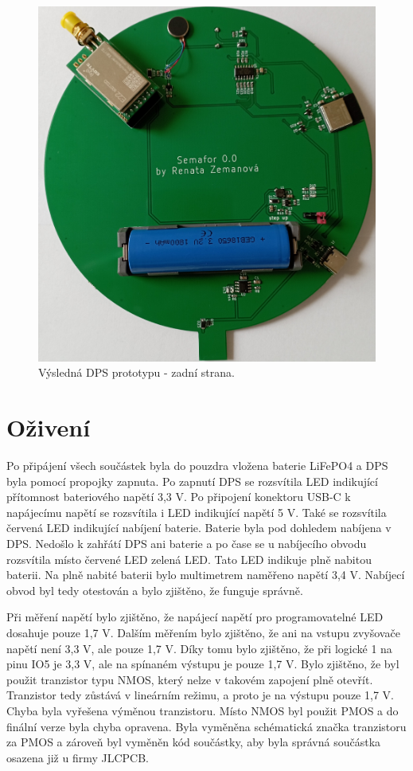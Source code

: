 \begin{figure}[!h]
  \begin{center}
    \includegraphics[scale=0.13]{obrazky/DPS_prototyp_bottom.jpg}
  \end{center}
  \caption[Výsledná DPS prototypu - zadní strana]{Výsledná DPS prototypu - zadní strana.}
\end{figure}

\section{Oživení}
Po připájení všech součástek byla do pouzdra vložena baterie LiFePO4 a DPS byla pomocí propojky zapnuta. Po zapnutí DPS se rozsvítila LED indikující přítomnost bateriového napětí 3,3 V. 
Po připojení konektoru USB-C k napájecímu napětí se rozsvítila i LED indikující napětí 5 V. Také se rozsvítila červená LED indikující nabíjení baterie. Baterie byla pod dohledem 
nabíjena v DPS. Nedošlo k zahřátí DPS ani baterie a po čase se u nabíjecího obvodu rozsvítila místo červené LED zelená LED. Tato LED indikuje plně nabitou baterii. Na plně nabité 
baterii bylo multimetrem naměřeno napětí 3,4 V. Nabíjecí obvod byl tedy otestován a bylo zjištěno, že funguje správně. 

Při měření napětí bylo zjištěno, že napájecí napětí pro programovatelné LED dosahuje pouze 1,7 V. Dalším měřením bylo zjištěno, že ani na vstupu zvyšovače napětí není 3,3 V, ale 
pouze 1,7 V. Díky tomu bylo zjištěno, že při logické 1 na pinu IO5 je 3,3 V, ale na spínaném výstupu je pouze 1,7 V. Bylo zjištěno, že byl použit tranzistor typu NMOS, který nelze 
v takovém zapojení plně otevřít. Tranzistor tedy zůstává v lineárním režimu, a proto je na výstupu pouze 1,7 V. Chyba byla vyřešena výměnou tranzistoru. Místo NMOS byl použit PMOS 
a do finální verze byla chyba opravena. Byla vyměněna schématická značka tranzistoru za PMOS a zároveň byl vyměněn kód součástky, aby byla správná součástka osazena již u firmy JLCPCB. 


